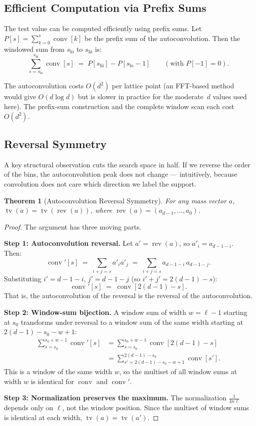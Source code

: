 \documentclass[11pt, letterpaper]{article}
\theoremstyle{paperplain}
\newtheorem{theorem}{Theorem}[section]
\theoremstyle{paperdef}
\newcommand{\tv}{\operatorname{tv}}
\newcommand{\rev}{\operatorname{rev}}
\newcommand{\conv}{\operatorname{conv}}
\begin{document}
\subsection{Efficient Computation via Prefix Sums}

The test value can be computed efficiently using prefix sums.  Let
$P[s] = \sum_{k=0}^{s} \conv[k]$ be the prefix sum of the
autoconvolution.  Then the windowed sum from $s_{\text{lo}}$ to
$s_{\text{hi}}$ is:
\[
  \sum_{s=s_\text{lo}}^{s_\text{hi}} \conv[s]
  \;=\;
  P[s_\text{hi}] - P[s_\text{lo} - 1]
  \qquad (\text{with } P[-1] = 0).
\]

The autoconvolution costs $O(d^2)$ per lattice point (an FFT-based
method would give $O(d \log d)$ but is slower in practice for the
moderate~$d$ values used here).  The prefix-sum construction and the
complete window scan each cost $O(d^2)$.

\subsection{Reversal Symmetry}\label{subsec:reversal}

A key structural observation cuts the search space in half.  If we
reverse the order of the bins, the autoconvolution peak does not change
--- intuitively, because convolution does not care which direction we
label the support.

\begin{theorem}[Autoconvolution Reversal Symmetry]
\label{thm:reversal}
For any mass vector $a$, $\tv(a) = \tv(\rev(a))$, where
$\rev(a) = (a_{d-1}, \ldots, a_0)$.
\end{theorem}

\begin{proof}
The argument has three moving parts.

\medskip
\noindent\textbf{Step 1: Autoconvolution reversal.}
Let $a' = \rev(a)$, so $a'_i = a_{d-1-i}$.  Then:
\[
  \conv'[s]
  \;=\; \sum_{i+j=s} a'_i a'_j
  \;=\; \sum_{i+j=s} a_{d-1-i}\, a_{d-1-j}.
\]
Substituting $i' = d-1-i$, $j' = d-1-j$ (so $i'+j' = 2(d-1) - s$):
\[
  \conv'[s] \;=\; \conv[2(d-1) - s].
\]
That is, the autoconvolution of the reversal is the reversal of the
autoconvolution.

\medskip
\noindent\textbf{Step 2: Window-sum bijection.}
A window sum of width $w = \ell - 1$ starting at $s_0$ transforms
under reversal to a window sum of the same width starting at
$2(d-1) - s_0 - w + 1$:
\begin{align*}
  \sum_{s=s_0}^{s_0+w-1} \conv'[s]
  &= \sum_{s=s_0}^{s_0+w-1} \conv[2(d-1)-s] \\
  &= \sum_{s'=2(d-1)-s_0-w+1}^{2(d-1)-s_0} \conv[s'].
\end{align*}
This is a window of the same width $w$, so the multiset of all window
sums at width $w$ is identical for $\conv$ and $\conv'$.

\medskip
\noindent\textbf{Step 3: Normalization preserves the maximum.}
The normalization $\tfrac{1}{4n\ell}$ depends only on $\ell$, not the
window position.  Since the multiset of window sums is identical at
each width, $\tv(a) = \tv(a')$.
\end{proof}
\end{document}
